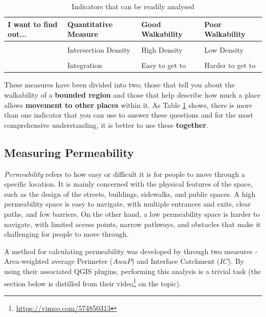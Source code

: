 \documentclass[
]{latex/krantz}
\renewcommand{\href}[2]{#2\footnote{\url{#1}}}
\DeclareRobustCommand{\href}[2]{#2\footnote{\url{#1}}}
\begin{document}
\begin{table}

\caption{\label{tab:physical-indicators}Indicators that can be readily analysed}
\centering
\begin{tabular}[t]{>{\raggedright\arraybackslash}p{10em}lll}
\toprule
I want to find out... & Quantitative Measure & Good Walkability & Poor Walkability\\
\midrule
\textbf{\cellcolor{gray!6}{If it is easy to move within a specific place}} & \cellcolor{gray!6}{Permeability} & \cellcolor{gray!6}{Easy to move around} & \cellcolor{gray!6}{Hard to move around}\\
\textbf{} & Intersection Density & High Density & Low Density\\
\textbf{\cellcolor{gray!6}{If it is easy to move from one place to another}} & \cellcolor{gray!6}{Connectedness} & \cellcolor{gray!6}{Well connected} & \cellcolor{gray!6}{Poorly Connected}\\
\textbf{} & Integration & Easy to get to & Harder to get to\\
\bottomrule
\end{tabular}
\end{table}

These measures have been divided into two; those that tell you about the walkability of a \textbf{bounded region} and those that help describe how much a place allows \textbf{movement to other places} within it. As Table \ref{tab:physical-indicators} shows, there is more than one indicator that you can use to answer these questions and for the most comprehensive understanding, it is better to use these \textbf{together}.

\hypertarget{block-sizes}{%
\subsection{Measuring Permeability}\label{block-sizes}}

\emph{Permeability} refers to how easy or difficult it is for people to move through a specific location. It is mainly concerned with the physical features of the space, such as the design of the streets, buildings, sidewalks, and public spaces. A high permeability space is easy to navigate, with multiple entrances and exits, clear paths, and few barriers. On the other hand, a low permeability space is harder to navigate, with limited access points, narrow pathways, and obstacles that make it challenging for people to move through.

A method for calculating permeability was developed by \textcite{pafkaPermeabilityInterfaceCatchment2017} through two measures - Area-weighted average Perimeter (\(AwaP\)) and Interface Catchment (\(IC\)). By using their associated QGIS plugins, performing this analysis is a trivial task (the section below is distilled from their \href{https://vimeo.com/574850313}{video} on the topic).
\end{document}
